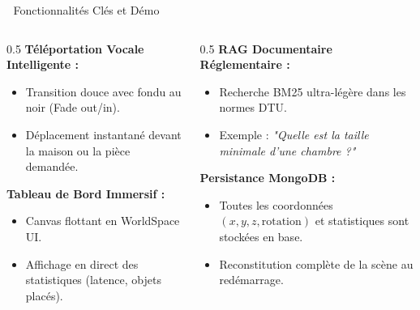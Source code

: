 \documentclass[aspectratio=169]{beamer}
\begin{document}
\begin{frame}{🚀 Fonctionnalités Clés et Démo}
  \begin{columns}
    \begin{column}{0.5\textwidth}
      \textbf{Téléportation Vocale Intelligente :}
      \begin{itemize}
        \item Transition douce avec fondu au noir (Fade out/in).
        \item Déplacement instantané devant la maison ou la pièce demandée.
      \end{itemize}
      \vspace{0.2cm}
      \textbf{Tableau de Bord Immersif :}
      \begin{itemize}
        \item Canvas flottant en WorldSpace UI.
        \item Affichage en direct des statistiques (latence, objets placés).
      \end{itemize}
    \end{column}
    
    \begin{column}{0.5\textwidth}
      \textbf{RAG Documentaire Réglementaire :}
      \begin{itemize}
        \item Recherche BM25 ultra-légère dans les normes DTU.
        \item Exemple : \textit{"Quelle est la taille minimale d'une chambre ?"}
      \end{itemize}
      \vspace{0.2cm}
      \textbf{Persistance MongoDB :}
      \begin{itemize}
        \item Toutes les coordonnées $(x, y, z, \text{rotation})$ et statistiques sont stockées en base.
        \item Reconstitution complète de la scène au redémarrage.
      \end{itemize}
    \end{column}
  \end{columns}

\end{frame}
\end{document}
